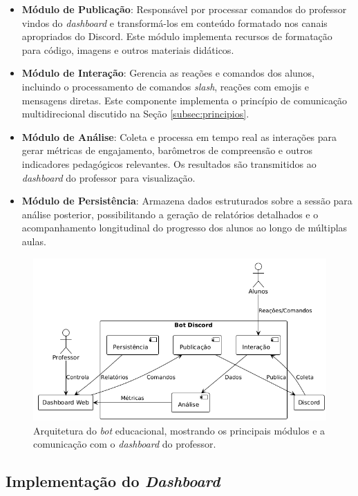 \begin{itemize}
\item \textbf{Módulo de Publicação}: Responsável por processar comandos do
professor vindos do \textit{dashboard} e transformá-los em conteúdo formatado
nos canais apropriados do Discord. Este módulo implementa recursos de formatação
para código, imagens e outros materiais didáticos.
\item \textbf{Módulo de Interação}: Gerencia as reações e comandos dos alunos,
incluindo o processamento de comandos \textit{slash}, reações com emojis e
mensagens diretas. Este componente implementa o princípio de comunicação
multidirecional discutido na Seção \ref{subsec:principios}.
\item \textbf{Módulo de Análise}: Coleta e processa em tempo real as interações
para gerar métricas de engajamento, barômetros de compreensão e outros
indicadores pedagógicos relevantes. Os resultados são transmitidos ao
\textit{dashboard} do professor para visualização.
\item \textbf{Módulo de Persistência}: Armazena dados estruturados sobre a
sessão para análise posterior, possibilitando a geração de relatórios detalhados
e o acompanhamento longitudinal do progresso dos alunos ao longo de múltiplas
aulas.
\end{itemize}

\begin{figure}[H] \centering
\centering
\includegraphics[width=16cm]{arquitetura-bot.png}
\caption{Arquitetura do \textit{bot} educacional, mostrando os principais
módulos e a comunicação com o \textit{dashboard} do professor.}
\label{fig:arquitetura-bot}
\end{figure}

\subsection{Implementação do \textit{Dashboard}}
\label{subsec:dashboard-impl}

